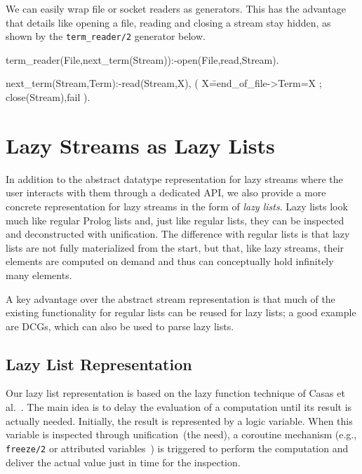 \documentclass[submission,copyright,creativecommons]{eptcs}
\begin{document}
We can easily wrap file or socket readers as generators. This has the
advantage that details like opening a file, reading and
closing a stream stay hidden, as shown by the 
{\tt term\_reader/2} generator below.

\begin{code}
term_reader(File,next_term(Stream)):-open(File,read,Stream).

next_term(Stream,Term):-read(Stream,X),
  ( X\==end_of_file->Term=X
  ; close(Stream),fail
  ).
\end{code}


\section{Lazy Streams as Lazy Lists}\label{ll}

In addition to the abstract datatype representation for lazy streams where the
user interacts with them through a dedicated API, we also provide a more concrete
representation for lazy streams in the form of {\em lazy lists}. Lazy lists
look much like regular Prolog lists and, just like regular lists, they can be
inspected and deconstructed with unification. The difference with regular lists
is that lazy lists are not fully materialized from the start, but that, like
lazy streams, their elements are computed on demand and thus can conceptually
hold infinitely many elements. 

A key advantage over the abstract stream representation is that much of the
existing functionality for regular lists can be reused for lazy lists; a good
example are DCGs, which can also be used to parse lazy lists.

\subsection{Lazy List Representation}

Our lazy list representation is based on the lazy function technique of Casas
et al.~\cite{lazyCiao,casas2005functional}. The main idea is to delay the
evaluation of a computation until its result is actually needed. Initially, the
result is represented by a logic variable. When this variable is inspected
through unification~(the need), a coroutine mechanism (e.g., {\tt freeze/2} or
attributed variables~\cite{holz92}) is triggered to perform the computation and
deliver the actual value just in time for the inspection.
\end{document}
